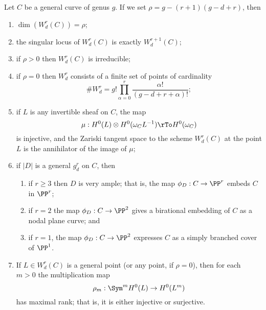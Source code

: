 \begin{theorem}\label{BN omnibus}
Let $C$ be a general curve of genus $g$. If we set $\rho = g - (r+1)(g-d+r)$, then
\begin{enumerate}
\item $\dim(W^r_d(C)) = \rho$;
\item\label{sing wrd} the singular locus of $W^r_d(C)$ is exactly $W^{r+1}_d(C)$;
\item\label{irr wrd} if $\rho > 0$ then $W^r_d(C)$ is irreducible;
\item\label{rho=0} if $\rho = 0$ then $W^r_d$ consists of a finite set of  points of cardinality
$$
\#W^r_d = g! \prod_{\alpha=0}^r \frac{\alpha!}{(g-d+r+\alpha)!};
$$
\item\label{Petri} if $L$ is any invertible sheaf on $C$, the map
$$
\mu : H^0(L) \otimes H^0(\omega_CL^{-1}) \rTo H^0(\omega_C)
$$
is injective, and the Zariski tangent space to the scheme $W^r_d(C)$ at the point $L$ is the annihilator of the image of $\mu$;
\item\label{general va} if $|D|$ is a general $g^r_d$ on $C$, then
\begin{enumerate}
\item if $r \geq 3$ then $D$ is very ample; that is, the map $\phi_D : C \to \PP^r$   embeds $C$ in $\PP^r$;
\item if $r=2$ the map $\phi_D : C \to \PP^2$ gives a birational embedding of $C$ as a nodal plane curve; and 
\item if $r=1$, the map $\phi_D : C \to \PP^2$ expresses $C$ as a simply branched cover of $\PP^1$.
\end{enumerate}

\item\label{maximal rank} If $L \in W^r_d(C)$ is a general point (or any point, if $\rho = 0$), then for each $m > 0$ the multiplication map
$$
\rho_m : \Sym^m H^0(L) \to H^0(L^m)
$$
has maximal rank; that is, it is either injective or surjective.
\end{enumerate}
\end{theorem}

